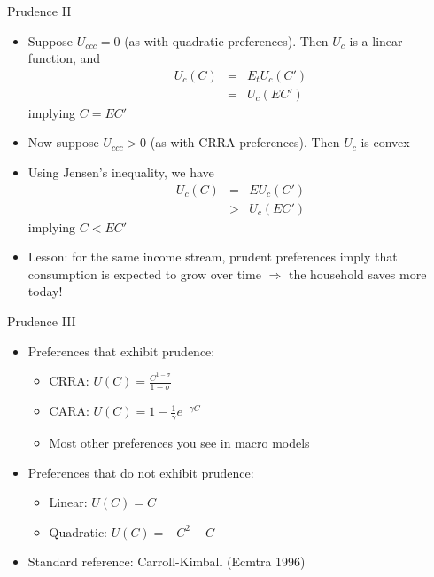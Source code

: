 \documentclass[9pt]{beamer}
\newcommand{\bit}{\begin{itemize}}
\newcommand{\eit}{\end{itemize}}
\begin{document}
\begin{frame}{Prudence II}

\bit
\setlength\itemsep{1em}

\item Suppose $U_{ccc} = 0$ (as with quadratic preferences). Then $U_c$ is a linear function, and
\begin{eqnarray}
U_c(C) &=& E_t U_c(C') \nonumber \\
&=& U_c(E C') \nonumber
\end{eqnarray}
implying $C = E C'$

\item Now suppose $U_{ccc}>0$ (as with CRRA preferences). Then $U_c$ is convex

\item Using Jensen's inequality, we have
\begin{eqnarray}
U_c(C) &=& E U_c(C') \nonumber \\
&>& U_c(E C') \nonumber
\end{eqnarray}
implying $C < E C'$

\item Lesson: for the same income stream, prudent preferences imply that consumption is expected to grow over time $\Rightarrow$ the household saves more today!
\eit

\end{frame}


\begin{frame}{Prudence III}

\bit
\setlength\itemsep{2em}

\item Preferences that exhibit prudence:
\bit
\item CRRA: $U(C)= \frac{C^{1-\sigma}}{1-\sigma}$
\item CARA: $U(C)= 1-\frac{1}{\gamma}e^{-\gamma C}$
\item Most other preferences you see in macro models
\eit

\item Preferences that do not exhibit prudence:
\bit
\item Linear: $U(C) = C$

\item Quadratic: $U(C) = -C^2 + \bar C$
\eit

\item Standard reference: Carroll-Kimball (Ecmtra 1996)

\eit

\end{frame}
\end{document}

